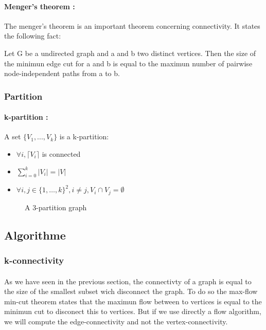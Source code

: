 \paragraph{Menger's theorem :}
The menger's theorem is an important theorem concerning connectivity.
It states the following fact:

Let G be a undirected graph and a and b two distinct vertices.
Then the size of the minimun edge cut for a and b is equal to the maximun number of pairwise node-independent paths from a to b.


\subsubsection{Partition}
\paragraph{k-partition :}
A set $\{V_1,...,V_k\}$ is a k-partition:
\begin{itemize}
    \item $\forall i, \lceil V_i \rceil$ is connected
    \item $\sum\limits_{i=0}^k|V_i| = |V|$
    \item $\forall i,j \in \{1, \dots, k\}^2, i \neq j, V_i \cap V_j = \emptyset$
\end{itemize}

\begin{figure}[!h]
    \begin{center}
        
    \end{center}
    \caption{A 3-partition graph}
\end{figure}

\subsection{Algorithme}
\subsubsection{k-connectivity}
\paragraph{}
As we have seen in the previous section, the connectivty of a graph is equal to the size of the smallest subset wich disconnect the graph.
To do so the max-flow min-cut theorem states that the maximun flow between to vertices is equal to the minimun cut to disconect this to vertices.
But if we use directly a flow algorithm, we will compute the edge-connectivity and not the vertex-connectivity.

